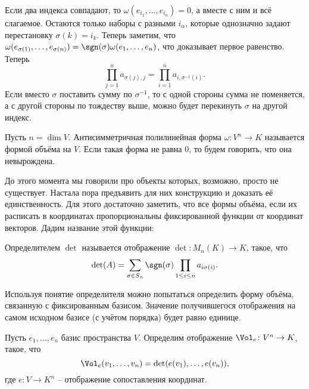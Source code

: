 Если два индекса совпадают, то $\omega(e_{i_1},\dots,e_{i_n})=0$, а вместе с ним и всё слагаемое. Остаются только наборы с разными $i_{\alpha}$, которые однозначно задают перестановку $\sigma(k)=i_k$. Теперь заметим, что $\omega(e_{\sigma(1)},\dots,e_{\sigma(n)})=\sgn(\sigma)\omega(e_1,\dots,e_n)$, что доказывает первое равенство. Теперь
$$\prod_{j=1}^n a_{\sigma(j),j}=\prod_{i=1}^n a_{i,\sigma^{-1}(i)}.$$
Если вместо $\sigma$ поставить сумму по $\sigma^{-1}$, то с одной стороны сумма не поменяется, а с другой стороны по тождеству выше, можно будет перекинуть $\sigma$ на другой индекс.
\endproof
\elm







\begin{defn}
Пусть $n=\dim V$. Антисимметричная полилинейная форма $\omega \colon V^n \to K $ называется формой объёма на $V$. Если такая форма не равна 0, то будем говорить, что она невырождена.
\end{defn}



До этого момента мы говорили про объекты которых, возможно, просто не существует. Настала пора предъявить для них конструкцию и доказать её единственность. Для этого достаточно заметить, что все формы объёма, если их расписать в координатах пропорциональны фиксированной функции от координат векторов. Дадим название этой функции:

\dfn  Определителем $\det$ называется отображение $\det \colon M_n(K) \to K$, такое, что $$\det(A)=\sum_{\sigma \in S_n} \sgn(\sigma)\prod_{1\leq i\leq n} a_{i\sigma(i)}.$$
\edfn

Используя понятие определителя можно попытаться определить форму объёма, связанную с фиксированным базисом. Значение получившегося отображения на  самом исходном базисе (с учётом порядка) будет равно единице.

\dfn Пусть $e_1,\dots,e_n$ базис пространства $V$. Определим отображение $\Vol_e \colon V^n \to K$, такое, что
$$\Vol_e(v_1,\dots,v_n)=\det(e(v_1),\dots, e(v_n)),$$
где $e\colon V \to K^n$ -- отображение сопоставления координат.
\edfn

